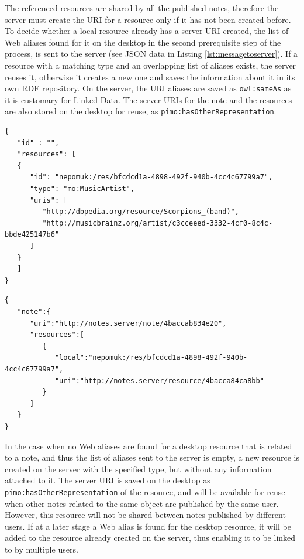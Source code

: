 The referenced resources are shared by all the published notes, therefore the server must create the URI for a resource only if it has not been created before. To decide whether a local resource already has a server URI created, the list of Web aliases found for it on the desktop in the second prerequisite step of the process, is sent to the server (see JSON data in Listing \ref{lst:messagetoserver}). If a resource with a matching type and an overlapping list of aliases exists, the server reuses it, otherwise it creates a new one and saves the information about it in its own RDF repository. On the server, the URI aliases are saved as \verb|owl:sameAs| as it is customary for Linked Data. The server URIs for the note and the resources are also stored on the desktop for reuse, as \verb|pimo:hasOtherRepresentation|.
\setlength\parindent{0in}
\begin{minipage}[t]{\linewidth}
\begin{lstlisting}
{
   "id" : "",
   "resources": [
   {
      "id": "nepomuk:/res/bfcdcd1a-4898-492f-940b-4cc4c67799a7",
      "type": "mo:MusicArtist",
      "uris": [
         "http://dbpedia.org/resource/Scorpions_(band)",
         "http://musicbrainz.org/artist/c3cceeed-3332-4cf0-8c4c-bbde425147b6"
      ]
   }
   ]
}
\end{lstlisting}
\end{minipage}
\setlength\parindent{0.21in}

\setlength\parindent{0in}
\begin{minipage}[t]{\linewidth}
\begin{lstlisting}
{
   "note":{
      "uri":"http://notes.server/note/4baccab834e20",
      "resources":[
         {
            "local":"nepomuk:/res/bfcdcd1a-4898-492f-940b-4cc4c67799a7",
            "uri":"http://notes.server/resource/4bacca84ca8bb"
         }
      ]
   }
}
\end{lstlisting}
\end{minipage}
\setlength\parindent{0.21in}

In the case when no Web aliases are found for a desktop resource that is related to a note, and thus the list of aliases sent to the server is empty, a new resource is created on the server with the specified type, but without any information attached to it. The server URI is saved on the desktop as \verb|pimo:hasOtherRepresentation| of the resource, and will be available for reuse when other notes related to the same object are published by the same user. However, this resource will not be shared between notes published by different users. If at a later stage a Web alias is found for the desktop resource, it will be added to the resource already created on the server, thus enabling it to be linked to by multiple users.

